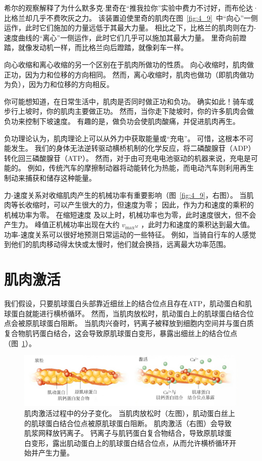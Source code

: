 希尔的观察解释了为什么默多克$\cdot$里奇在“推我拉你”实验中费力不讨好，而布伦达·比格兰却几乎不费吹灰之力。
该装置迫使里奇的肌肉在图~\ref{fig:4_9}~中“向心”一侧运作，此时它们施加的力量远低于其最大力量。
相比之下，比格兰的肌肉则在力-速度曲线的“离心”一侧运作，此时它们几乎可以施加其最大力量。
里奇向前蹬踏，就像发动机一样，而比格兰向后蹬踏，就像刹车一样。


向心收缩和离心收缩的另一个区别在于肌肉所做功的性质。
向心收缩时，肌肉做正功，因为力和位移的方向相同。
然而，离​​心收缩时，肌肉也做功（即肌肉做功为负），因为力和位移的方向相反。


你可能想知道，在日常生活中，肌肉是否同时做正功和负功。
确实如此！骑车或步行上坡时，你的肌肉主要做正功。
然而，当你走下陡坡时，你的许多肌肉会做负功来控制下坡速度。
有趣的是，做负功会使肌肉酸痛，并促进肌肉再生。


负功理论认为，肌肉理论上可以从外力中获取能量或“充电”。
可惜，这根本不可能发生。
我们的身体无法逆转驱动横桥机制的化学反应，将二磷酸腺苷（ADP）转化回三磷酸腺苷（ATP）。
然而，对于由可充电电池驱动的机器来说，充电是可能的。
例如，传统汽车的摩擦制动器将动能转化为热能，而电动汽车则利用再生制动来捕获和储存这种能量。


力-速度关系对收缩肌肉产生的机械功率有重要影响（图~\ref{fig:4_9}，右图）。
当肌肉等长收缩时，可以产生很大的力，但速度为零；
因此，作为力和速度的乘积的机械功率为零。
在缩短速度 及以上时，机械功率也为零，此时速度很大，但不会产生力。
峰值正机械功率出现在大约 $v_{\text{max}^M}$ ，此时力和速度的乘积达到最大值。
功率-速度关系可以很好地预测日常运动的一些特征。
例如，当骑自行车的人感觉到他们的肌肉移动得太快或太慢时，他们就会换挡，远离最大功率范围。


\section{肌肉激活}

我们假设，只要肌球蛋白头部靠近细丝上的结合位点且存在ATP，肌动蛋白和肌球蛋白就能进行横桥循环。
然而，当肌肉放松时，肌动蛋白上的肌球蛋白结合位点会被原肌球蛋白阻断。
当肌肉兴奋时，钙离子被释放到细胞内空间并与蛋白质复合物肌钙蛋白结合，这会导致原肌球蛋白变形，暴露出细丝上的结合位点（图~\ref{fig:4_10}）。


\begin{figure}[!htb]
	\centering
	\includegraphics[width=1.0\linewidth]{chap4/4_10}
	\caption{肌肉激活过程中的分子变化。
		当肌肉放松时（左图），肌动蛋白丝上的肌球蛋白结合位点被原肌球蛋白阻断。
		肌肉激活（右图）会导致肌浆网释放钙离子。
		钙离子与肌钙蛋白复合物结合，导致原肌球蛋白变形，露出肌动蛋白上的肌球蛋白结合位点，从而允许横桥循环开始并产生力量。 \label{fig:4_10}}
\end{figure}

